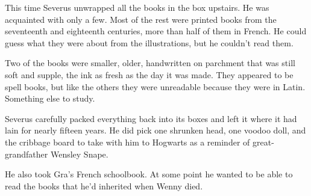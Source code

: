 This time Severus unwrapped all the books in the box upstairs. He was acquainted with only a few. Most of the rest were printed books from the seventeenth and eighteenth centuries, more than half of them in French. He could guess what they were about from the illustrations, but he couldn't read them.

Two of the books were smaller, older, handwritten on parchment that was still soft and supple, the ink as fresh as the day it was made. They appeared to be spell books, but like the others they were unreadable because they were in Latin. Something else to study.

Severus carefully packed everything back into its boxes and left it where it had lain for nearly fifteen years. He did pick one shrunken head, one voodoo doll, and the cribbage board to take with him to Hogwarts as a reminder of great-grandfather Wensley Snape.

He also took Gra's French schoolbook. At some point he wanted to be able to read the books that he'd inherited when Wenny died.


